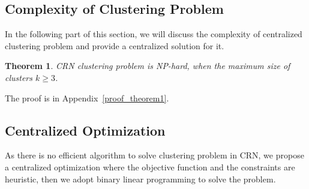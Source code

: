 \documentclass[10pt,journal,compsoc]{IEEEtran}
\theoremstyle{mytheoremstyle}
\newtheorem{theorem}{Theorem}[section]
\theoremstyle{mytheoremstyle}
\theoremstyle{mytheoremstyle}
\newcommand{\ie}{i.e., }
\begin{document}
\subsection{Complexity of Clustering Problem}
In the following part of this section, we will discuss the complexity of centralized clustering problem and provide a centralized solution for it.

\begin{theorem}
\label{theorem1}
CRN clustering problem is NP-hard, when the maximum size of clusters $k\geqslant 3$.
\end{theorem}
The proof is in Appendix~\ref{proof_theorem1}.



\subsection{Centralized Optimization}
\label{centralized_opt}
As there is no efficient algorithm to solve clustering problem in CRN, we propose a centralized optimization where the objective function and the constraints are heuristic, then we adopt binary linear programming to solve the problem.


\end{document}
